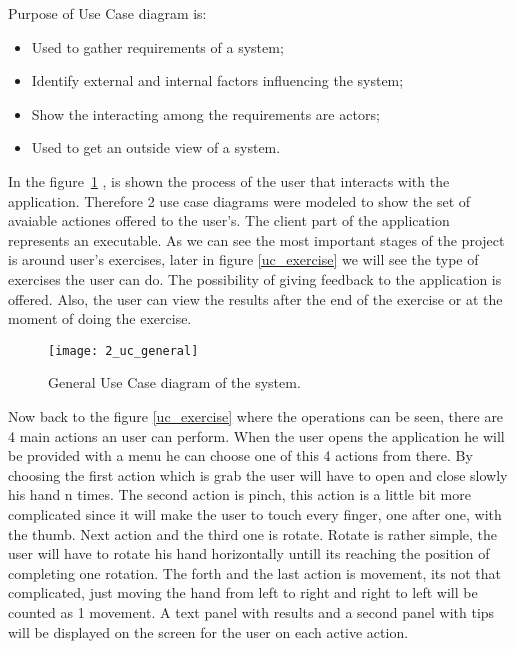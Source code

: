 Purpose of Use Case diagram is:

\begin{itemize}
\item Used to gather requirements of a system;
\item Identify external and internal factors influencing the system;
\item Show the interacting among the requirements are actors;
\item Used to get an outside view of a system.

\end{itemize}
\vspace{0.2cm}


In the \mbox{figure \ref{uc_general}} , is shown the process of the user that interacts with the application. Therefore 2 use case diagrams were modeled to show the set of avaiable actiones offered to the user's. The client part of the application represents an executable. As we can see the most important stages of the project is around  user's exercises, later in \mbox{figure} \ref{uc_exercise} we will see the type of exercises the user can do. The possibility of giving feedback to the application is offered. Also, the user can view the results after the end of the exercise or at the moment of doing the exercise.


\begin{figure}[!h]
\centering
\texttt{[image: 2\_uc\_general]}
\caption{General Use Case diagram of the system.}\label{uc_general}
\end{figure}

Now back to the \mbox{figure} \ref{uc_exercise} where the operations can be seen, there are 4 main actions an user can perform. When the user opens the application he will be provided with a menu he can choose one of this 4 actions from there. By choosing the first action which is grab the user will have to open and close slowly his hand n times. The second action is pinch, this action is a little bit more complicated since it will make the user to touch every finger, one after one, with the thumb. Next action and the third one is rotate. Rotate is rather simple, the user will have to rotate his hand horizontally untill its reaching the position of completing one rotation. The forth and the last action is movement, its not that complicated, just moving the hand from left to right and right to left will be counted as 1 movement. A text panel with results and a second panel with tips will be displayed on the screen for the user on each active action.


